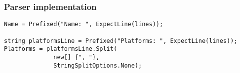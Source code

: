 \begin{frame}[fragile]
    \frametitle{Parser implementation}

\begin{lstlisting}
Name = Prefixed("Name: ", ExpectLine(lines));

string platformsLine = Prefixed("Platforms: ", ExpectLine(lines));
Platforms = platformsLine.Split(
              new[] {", "},
              StringSplitOptions.None);
\end{lstlisting}
\end{frame}
